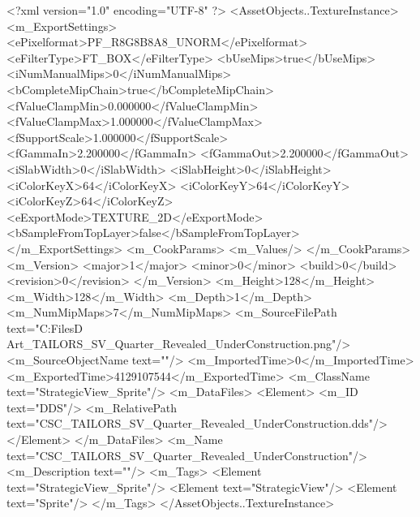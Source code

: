<?xml version="1.0" encoding="UTF-8" ?>
<AssetObjects..TextureInstance>
	<m_ExportSettings>
		<ePixelformat>PF_R8G8B8A8_UNORM</ePixelformat>
		<eFilterType>FT_BOX</eFilterType>
		<bUseMips>true</bUseMips>
		<iNumManualMips>0</iNumManualMips>
		<bCompleteMipChain>true</bCompleteMipChain>
		<fValueClampMin>0.000000</fValueClampMin>
		<fValueClampMax>1.000000</fValueClampMax>
		<fSupportScale>1.000000</fSupportScale>
		<fGammaIn>2.200000</fGammaIn>
		<fGammaOut>2.200000</fGammaOut>
		<iSlabWidth>0</iSlabWidth>
		<iSlabHeight>0</iSlabHeight>
		<iColorKeyX>64</iColorKeyX>
		<iColorKeyY>64</iColorKeyY>
		<iColorKeyZ>64</iColorKeyZ>
		<eExportMode>TEXTURE_2D</eExportMode>
		<bSampleFromTopLayer>false</bSampleFromTopLayer>
	</m_ExportSettings>
	<m_CookParams>
		<m_Values/>
	</m_CookParams>
	<m_Version>
		<major>1</major>
		<minor>0</minor>
		<build>0</build>
		<revision>0</revision>
	</m_Version>
	<m_Height>128</m_Height>
	<m_Width>128</m_Width>
	<m_Depth>1</m_Depth>
	<m_NumMipMaps>7</m_NumMipMaps>
	<m_SourceFilePath text="C:\Users\Shadow\Desktop\Working Files\2D Art\Quarters\Tailors\StrategicView\CSC_TAILORS_SV_Quarter_Revealed_UnderConstruction.png"/>
	<m_SourceObjectName text=""/>
	<m_ImportedTime>0</m_ImportedTime>
	<m_ExportedTime>4129107544</m_ExportedTime>
	<m_ClassName text="StrategicView_Sprite"/>
	<m_DataFiles>
		<Element>
			<m_ID text="DDS"/>
			<m_RelativePath text="CSC_TAILORS_SV_Quarter_Revealed_UnderConstruction.dds"/>
		</Element>
	</m_DataFiles>
	<m_Name text="CSC_TAILORS_SV_Quarter_Revealed_UnderConstruction"/>
	<m_Description text=""/>
	<m_Tags>
		<Element text="StrategicView_Sprite"/>
		<Element text="StrategicView"/>
		<Element text="Sprite"/>
	</m_Tags>
</AssetObjects..TextureInstance>

